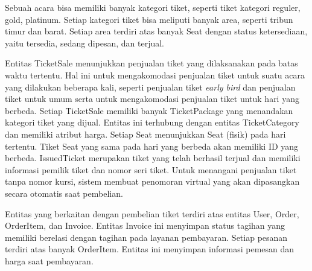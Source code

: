 \pagebreak

Sebuah acara bisa memiliki banyak kategori tiket, seperti tiket kategori reguler, gold, platinum. Setiap kategori tiket bisa meliputi banyak area, seperti tribun timur dan barat. Setiap area terdiri atas banyak Seat dengan status ketersediaan, yaitu tersedia, sedang dipesan, dan terjual.

Entitas TicketSale menunjukkan penjualan tiket yang dilaksanakan pada batas waktu tertentu. Hal ini untuk mengakomodasi penjualan tiket untuk suatu acara yang dilakukan beberapa kali, seperti penjualan tiket \textit{early bird} dan penjualan tiket untuk umum serta untuk mengakomodasi penjualan tiket untuk hari yang berbeda. Setiap TicketSale memiliki banyak TicketPackage yang menandakan kategori tiket yang dijual. Entitas ini terhubung dengan entitas TicketCategory dan memiliki atribut harga. Setiap Seat menunjukkan Seat (fisik) pada hari tertentu. Tiket Seat yang sama pada hari yang berbeda akan memiliki ID yang berbeda. IssuedTicket merupakan tiket yang telah berhasil terjual dan memiliki informasi pemilik tiket dan nomor seri tiket. Untuk menangani penjualan tiket tanpa nomor kursi, sistem membuat penomoran virtual yang akan dipasangkan secara otomatis saat pembelian.

Entitas yang berkaitan dengan pembelian tiket terdiri atas entitas User, Order, OrderItem, dan Invoice. Entitas Invoice ini menyimpan status tagihan yang memiliki berelasi dengan tagihan pada layanan pembayaran. Setiap pesanan terdiri atas banyak OrderItem. Entitas ini menyimpan informasi pemesan dan harga saat pembayaran.

